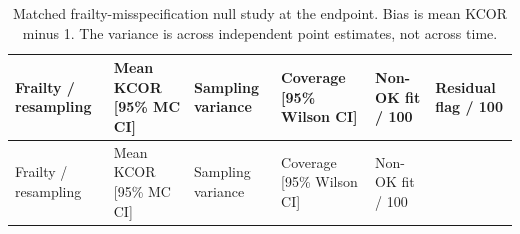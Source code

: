 \documentclass[
]{article}
\begin{document}
\begin{longtable}[]{@{}
  >{\raggedright\arraybackslash}p{}
  >{\raggedleft\arraybackslash}p{}
  >{\raggedleft\arraybackslash}p{}
  >{\raggedleft\arraybackslash}p{}
  >{\raggedleft\arraybackslash}p{}
  >{\raggedleft\arraybackslash}p{}@{}}
\caption{Matched frailty-misspecification null study at the endpoint. Bias is mean KCOR minus 1. The variance is across independent point estimates, not across time.}\label{tbl:si_misspecification}\tabularnewline
\toprule\noalign{}
\begin{minipage}[b]{\linewidth}\raggedright
Frailty / resampling
\end{minipage} & \begin{minipage}[b]{\linewidth}\raggedleft
Mean KCOR {[}95\% MC CI{]}
\end{minipage} & \begin{minipage}[b]{\linewidth}\raggedleft
Sampling variance
\end{minipage} & \begin{minipage}[b]{\linewidth}\raggedleft
Coverage {[}95\% Wilson CI{]}
\end{minipage} & \begin{minipage}[b]{\linewidth}\raggedleft
Non-OK fit / 100
\end{minipage} & \begin{minipage}[b]{\linewidth}\raggedleft
Residual flag / 100
\end{minipage} \\
\midrule\noalign{}
\endfirsthead
\toprule\noalign{}
\begin{minipage}[b]{\linewidth}\raggedright
Frailty / resampling
\end{minipage} & \begin{minipage}[b]{\linewidth}\raggedleft
Mean KCOR {[}95\% MC CI{]}
\end{minipage} & \begin{minipage}[b]{\linewidth}\raggedleft
Sampling variance
\end{minipage} & \begin{minipage}[b]{\linewidth}\raggedleft
Coverage {[}95\% Wilson CI{]}
\end{minipage} & \begin{minipage}[b]{\linewidth}\raggedleft
Non-OK fit / 100
\end{minipage} & \begin{minipage}[b]{\linewidth}\raggedleft

\end{minipage}
\end{longtable}
\end{document}
